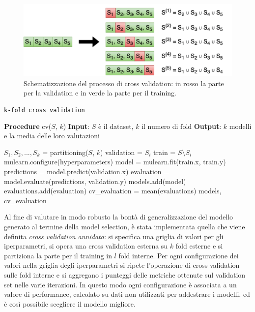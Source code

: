 \documentclass[12pt]{report}
\theoremstyle{definition}
\begin{document}
\begin{figure}
    \centering
    \includegraphics[scale=0.83]{images/cv.png}
    \caption{Schematizzazione del processo di cross validation: in rosso la parte per la validation e in verde la parte per il training.}
    \label{cv}
\end{figure}
\begin{algorithm}
\caption{\texttt{k-fold cross validation}}
\label{kfold}
\hspace*{\algorithmicindent} \textbf{Procedure} cv($S$, $k$)
\newline
\hspace*{\algorithmicindent} \textbf{Input}: $S$ è il dataset, $k$ il numero di fold
\newline
\hspace*{\algorithmicindent} \textbf{Output}: $k$ modelli e la media delle loro valutazioni
\begin{algorithmic}[1]
\STATE $S_1, S_2, ..., S_k$ = partitioning($S$, $k$)
\STATE validation = $S_i$
\STATE train = $S \setminus S_i$
\STATE mulearn.configure(hyperparameters)
\STATE model = mulearn.fit(train.x, train.y)
\STATE predictions = model.predict(validation.x)
\STATE evaluation = model.evaluate(predictions, validation.y)
\STATE models.add(model)
\STATE evaluations.add(evaluation)
\ENDFOR
\STATE cv\_evaluation = mean(evaluations)
\RETURN models, cv\_evaluation
\end{algorithmic}
\end{algorithm}
Al fine di valutare in modo robusto la bontà di generalizzazione del modello generato al termine della model selection, è stata implementata quella che viene definita \textit{cross validation annidata}: si specifica una griglia di valori per gli iperparametri, si opera una cross validation esterna su $k$ fold esterne e si partiziona la parte per il training in $l$ fold interne. Per ogni configurazione dei valori nella griglia degli iperparametri si ripete l'operazione di cross validation sulle fold interne e si aggregano i punteggi delle metriche ottenute sul validation set nelle varie iterazioni.
In questo modo ogni configurazione è associata a un valore di performance, calcolato su dati non utilizzati per addestrare i modelli, ed è così possibile scegliere il modello migliore.
\end{document}
